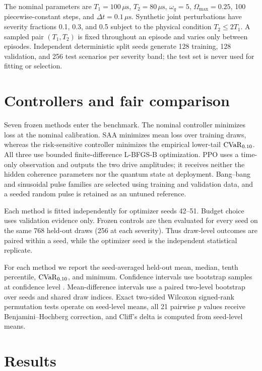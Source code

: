 \documentclass[preprint,aps,pra,superscriptaddress,longbibliography]{revtex4-2}
\begin{document}
The nominal parameters are $T_1=100\,\mu\mathrm{s}$, $T_2=80\,\mu\mathrm{s}$, $\omega_q=5$, $\Omega_{\max}=0.25$, 100 piecewise-constant steps, and $\Delta t=0.1\,\mu\mathrm{s}$.  Synthetic joint perturbations have severity fractions 0.1, 0.3, and 0.5 subject to the physical condition $T_2\leq2T_1$.  A sampled pair $(T_1,T_2)$ is fixed throughout an episode and varies only between episodes.  Independent deterministic split seeds generate 128 training, 128 validation, and 256 test scenarios per severity band; the test set is never used for fitting or selection.

\section{Controllers and fair comparison}
Seven frozen methods enter the benchmark.  The nominal controller minimizes loss at the nominal calibration.  SAA minimizes mean loss over training draws, whereas the risk-sensitive controller minimizes the empirical lower-tail $\mathrm{CVaR}_{0.10}$.  All three use bounded finite-difference L-BFGS-B optimization.  PPO uses a time-only observation and outputs the two drive amplitudes; it receives neither the hidden coherence parameters nor the quantum state at deployment.  Bang--bang and sinusoidal pulse families are selected using training and validation data, and a seeded random pulse is retained as an untuned reference.

Each method is fitted independently for optimizer seeds 42--51.  Budget choice uses validation evidence only.  Frozen controls are then evaluated for every seed on the same 768 held-out draws (256 at each severity).  Thus draw-level outcomes are paired within a seed, while the optimizer seed is the independent statistical replicate.

For each method we report the seed-averaged held-out mean, median, tenth percentile, $\mathrm{CVaR}_{0.10}$, and minimum.  Confidence intervals use \PVAnalysisBootstrapSamples{} bootstrap samples at confidence level \PVAnalysisConfidenceLevel.  Mean-difference intervals use a paired two-level bootstrap over seeds and shared draw indices.  Exact two-sided Wilcoxon signed-rank permutation tests operate on seed-level means, all 21 pairwise $p$ values receive Benjamini--Hochberg correction, and Cliff's delta is computed from seed-level means.

\section{Results}
\end{document}
